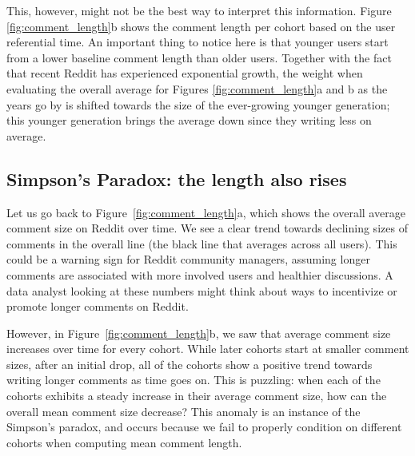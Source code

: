 This, however, might not be the best way to interpret this information. Figure \ref{fig:comment_length}b shows the comment length per cohort based on the user referential time.  
An important thing to notice here is that younger users start from a lower baseline comment length than older users. Together with the fact that recent Reddit has experienced exponential growth, the weight when evaluating the overall average for Figures \ref{fig:comment_length}a and b as the years go by is shifted towards the size of the ever-growing younger generation; this younger generation brings the average down since they writing less on average.

\subsection{Simpson's Paradox: the length also rises}

Let us go back to Figure~\ref{fig:comment_length}a, which shows the overall average comment size on Reddit over time. We see a clear trend towards declining sizes of comments in the overall line (the black line that averages across all users).
This could be a warning sign for Reddit community managers, assuming longer comments are associated with more involved users and healthier discussions. A data analyst looking at these numbers might think about ways to incentivize or promote longer comments on Reddit. 

However, in Figure~\ref{fig:comment_length}b, we saw that average comment size increases over time for every cohort. While later cohorts start at smaller comment sizes, after an initial drop, all of the cohorts show a positive trend towards writing longer comments as time goes on.  This is puzzling: when each of the cohorts exhibits a steady increase in their average comment size, how can the overall mean comment size decrease?  This anomaly is an instance of the Simpson's paradox, and occurs because we fail to properly condition on different cohorts when computing mean comment length. 


